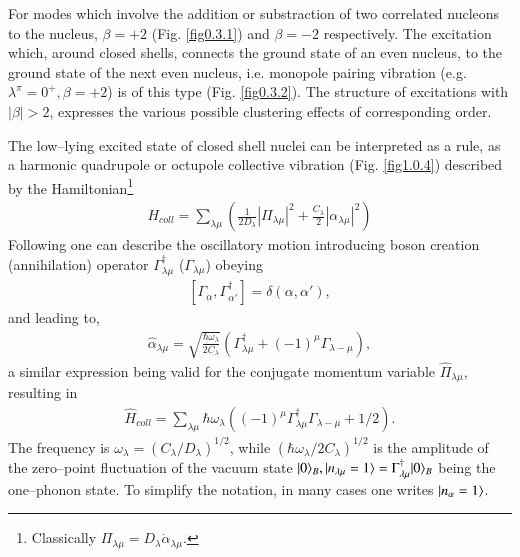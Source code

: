 For modes which involve the addition or substraction of two correlated nucleons to the nucleus, $\beta=+2$ (Fig. \ref{fig0.3.1}) and $\beta=-2$ respectively. The excitation which, around closed shells, connects the ground state of an even nucleus, to the ground state of the next even nucleus, i.e. monopole pairing vibration (e.g. $\lambda^\pi=0^+, \beta=+2$) is of this type (Fig. \ref{fig0.3.2}).
The structure of excitations with $|\beta|>2$, expresses the various possible clustering effects of corresponding order.

The low--lying excited state of closed shell nuclei can be interpreted as a rule, as a harmonic quadrupole or octupole collective vibration (Fig. \ref{fig1.0.4}) described by the Hamiltonian\footnote{Classically $\Pi_{\lambda\mu}=D_\lambda\dot\alpha_{\lambda\mu}$.}
\begin{align}\label{eq1.0.7}
H_{coll}=\sum_{\lambda\mu}\left(\frac{1}{2D_{\lambda}}|\Pi_{\lambda\mu}|^2+\frac{C_\lambda}{2}|\alpha_{\lambda\mu}|^2\right)
\end{align}
Following \cite{Dirac:26} one can describe the oscillatory motion introducing boson creation (annihilation) operator $\Gamma_{\lambda\mu}^\dagger$ ($\Gamma_{\lambda\mu}$) obeying
\begin{align}\label{eq1.0.8}
\left[\Gamma_{\alpha},\Gamma_{\alpha'}^\dagger\right]=\delta(\alpha,\alpha'),
\end{align}
and leading to, 
\begin{align}\label{eq1.0.9}
\hat\alpha_{\lambda\mu}=\sqrt{\frac{\hbar\omega_\lambda}{2C_\lambda}}\left(\Gamma_{\lambda\mu}^\dagger+(-1)^\mu\Gamma_{\lambda-\mu}\right),
\end{align}
 a similar expression being valid for the conjugate momentum variable $\hat\Pi_{\lambda\mu}$, resulting in 
\begin{align}\label{eq1.0.9b}
\hat H_{coll}=\sum_{\lambda\mu}\hbar\omega_\lambda\left((-1)^\mu\Gamma_{\lambda\mu}^\dagger\Gamma_{\lambda-\mu}+1/2\right).
\end{align}
The frequency is $\omega_\lambda=(C_\lambda/D_\lambda)^{1/2}$, while $(\hbar\omega_\lambda/2C_\lambda)^{1/2}$ is the amplitude of the zero--point fluctuation of the vacuum state $|{0} \rangle_B,|{n_{\lambda\mu}=1} \rangle=\Gamma_{\lambda\mu}^\dagger |{0} \rangle_B$ being the one--phonon state. To simplify the notation, in many cases one writes $|{n_\alpha=1} \rangle$.
